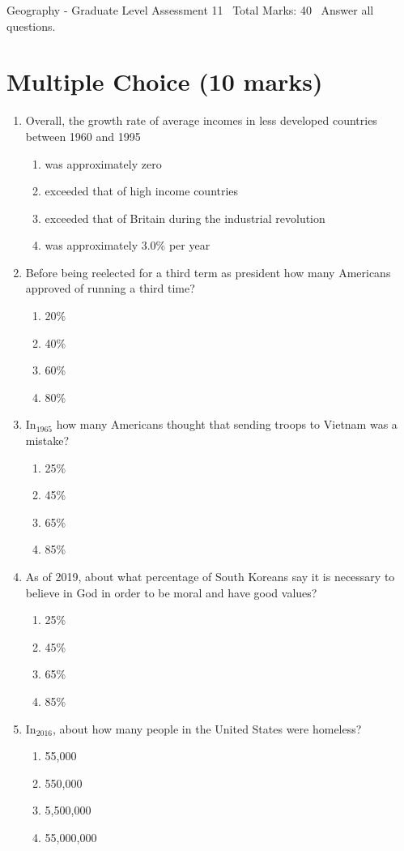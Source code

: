 \documentclass[12pt]{article}
\begin{document}
\begin{center}
Geography - Graduate Level Assessment 11 \
Total Marks: 40 \
Answer all questions.
\end{center}

\section*{Multiple Choice (10 marks)}
\begin{enumerate}[label=\arabic*.]
\item Overall, the growth rate of average incomes in less developed countries between 1960 and 1995
\begin{enumerate}[label=(\alph*)]
    \item was approximately zero
    \item exceeded that of high income countries
    \item exceeded that of Britain during the industrial revolution
    \item was approximately 3.0\% per year
\end{enumerate}
\item Before being reelected for a third term as president how many Americans approved of running a third time?
\begin{enumerate}[label=(\alph*)]
    \item 20\%
    \item 40\%
    \item 60\%
    \item 80\%
\end{enumerate}
\item In$_{1965}$ how many Americans thought that sending troops to Vietnam was a mistake?
\begin{enumerate}[label=(\alph*)]
    \item 25\%
    \item 45\%
    \item 65\%
    \item 85\%
\end{enumerate}
\item As of 2019, about what percentage of South Koreans say it is necessary to believe in God in order to be moral and have good values?
\begin{enumerate}[label=(\alph*)]
    \item 25\%
    \item 45\%
    \item 65\%
    \item 85\%
\end{enumerate}
\item In$_{2016}$, about how many people in the United States were homeless?
\begin{enumerate}[label=(\alph*)]
    \item 55,000
    \item 550,000
    \item 5,500,000
    \item 55,000,000
\end{enumerate}
\end{enumerate}
\end{document}
